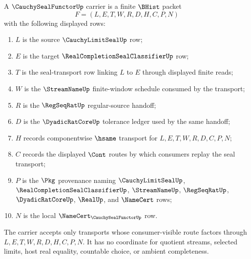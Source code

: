 \begin{definition}
\label{def:cauchy-seal-functor-carrier}
A $\CauchySealFunctorUp$ carrier is a finite $\BHist$ packet
$$
F=(L,E,T,W,R,D,H,C,P,N)
$$
with the following displayed rows:
\begin{enumerate}
\item $L$ is the source $\CauchyLimitSealUp$ row;
\item $E$ is the target $\RealCompletionSealClassifierUp$ row;
\item $T$ is the seal-transport row linking $L$ to $E$ through displayed finite reads;
\item $W$ is the $\StreamNameUp$ finite-window schedule consumed by the transport;
\item $R$ is the $\RegSeqRatUp$ regular-source handoff;
\item $D$ is the $\DyadicRatCoreUp$ tolerance ledger used by the same handoff;
\item $H$ records componentwise $\hsame$ transport for $L,E,T,W,R,D,C,P,N$;
\item $C$ records the displayed $\Cont$ routes by which consumers replay the seal transport;
\item $P$ is the $\Pkg$ provenance naming $\CauchyLimitSealUp$, $\RealCompletionSealClassifierUp$, $\StreamNameUp$, $\RegSeqRatUp$, $\DyadicRatCoreUp$, $\RealUp$, and $\NameCert$ rows;
\item $N$ is the local $\NameCert_{\CauchySealFunctorUp}$ row.
\end{enumerate}
The carrier accepts only transports whose consumer-visible route factors through $L,E,T,W,R,D,H,C,P,N$. It has no coordinate for quotient streams, selected limits, host real equality, countable choice, or ambient completeness.
\end{definition}

